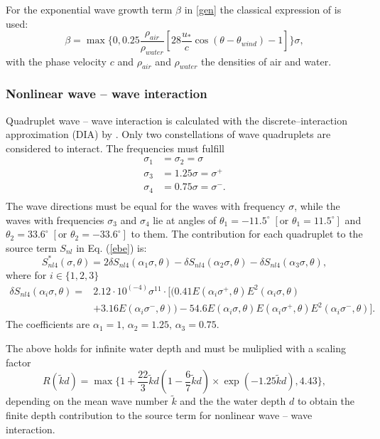 For the exponential wave growth term $\beta$ in \eqref{gen} the classical expression of \citep[][]{komen1984} is used:
\begin{equation}
 \beta = \max \{ 0,0.25 \frac{\rho_{air}}{\rho_{water}} \left[28 \frac{u_\ast}{c} \cos(\theta - \theta_{wind}) -1 \right] \} \sigma,
\end{equation}
with the phase velocity $c$ and $\rho_{air}$ and $\rho_{water}$ the densities of air and water.

\subsubsection{Nonlinear wave -- wave interaction}

Quadruplet wave -- wave interaction is calculated with the discrete--interaction approximation (DIA) by \citep[][]{hasselmann1985}. Only two constellations of wave quadruplets are considered to interact. The frequencies must fulfill
\begin{align*}
 \sigma_1 &= \sigma_2 = \sigma \\
 \sigma_3 &= 1.25 \sigma = \sigma^+ \\
 \sigma_4 &= 0.75 \sigma = \sigma^- .\\
\end{align*}
The wave directions must be equal for the waves with frequency $\sigma$, while the waves with frequencies $\sigma_3$ and $\sigma_4$ lie at angles of $\theta_1 = -11.5^\circ \; \left[ \text{or } \theta_1 = 11.5^\circ \right]$ and $\theta_2 = 33.6^\circ \; \left[ \text{or } \theta_2 = -33.6^\circ \right]$  to them. The contribution for each quadruplet to the source term $S_{nl}$ in Eq. (\ref{ebe}) is:
\begin{equation}
 S_{nl4}^\ast (\sigma, \theta) = 2 \delta S_{nl4} (\alpha_1 \sigma, \theta) - \delta S_{nl4} (\alpha_2 \sigma, \theta) - \delta S_{nl4} (\alpha_3 \sigma, \theta),
\end{equation}
where for $i \in \{1,2,3\}$
\begin{align*}
 \delta S_{nl4} ( \alpha_i \sigma, \theta ) = & 2.12 \cdot 10^{(-4)} \sigma^{11} \cdot [ ( 0.41 E(\alpha_i \sigma^+, \theta)E^2(\alpha_i \sigma, \theta) \\
 &+ 3.16 E(\alpha_i \sigma^-, \theta) ) - 54.6 E(\alpha_i \sigma, \theta) E(\alpha_i \sigma^+, \theta) E^2(\alpha_i \sigma^-, \theta) ] .
\end{align*}
The coefficients are $\alpha_1 = 1, \, \alpha_2 = 1.25, \, \alpha_3 = 0.75$. 

The above holds for infinite water depth and must be muliplied with a scaling factor 
\begin{equation}
 R ( \tilde{k}d ) = \max \{ 1+ \frac{22}{3}\tilde{k}d \left( 1-\frac{6}{7} \tilde{k}d \right) \times \exp(-1.25 \tilde{k}d) , 4.43 \} ,
\end{equation}
depending on the mean wave number $\tilde{k}$ and the the water depth $d$ to obtain the finite depth contribution to the source term for nonlinear wave -- wave interaction.

